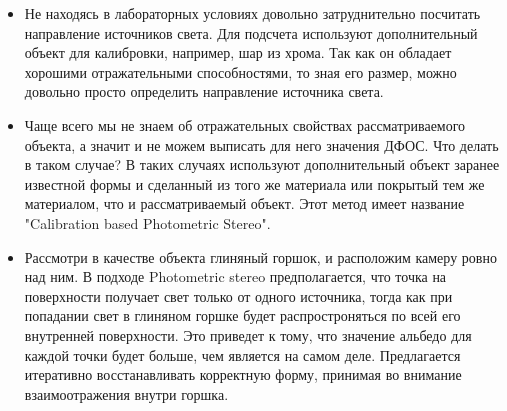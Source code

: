 \begin{itemize}
  \item Не находясь в лабораторных условиях довольно затруднительно посчитать
        направление источников света. Для подсчета используют дополнительный объект
        для калибровки, например, шар из хрома. Так как он обладает хорошими
        отражательными способностями, то зная его размер, можно довольно просто
        определить направление источника света.
  \item Чаще всего мы не знаем об отражательных свойствах рассматриваемого
        объекта, а значит и не можем выписать для него значения ДФОС. Что делать в таком случае?
        В таких случаях используют дополнительный объект заранее известной формы
        и сделанный из того же материала или покрытый тем же материалом, что и рассматриваемый объект.
        Этот метод имеет название "Calibration based Photometric Stereo".
  \item Рассмотри в качестве объекта глиняный горшок, и расположим камеру ровно над ним.
        В подходе Photometric stereo предполагается, что точка на поверхности
        получает свет только от одного источника, тогда как при попадании свет
        в глиняном горшке будет распростроняться по всей его внутренней поверхности.
        Это приведет к тому, что значение альбедо для каждой точки будет
        больше, чем является на самом деле. Предлагается
        итеративно восстанавливать корректную форму, принимая во внимание
        взаимоотражения внутри горшка.
\end{itemize}

